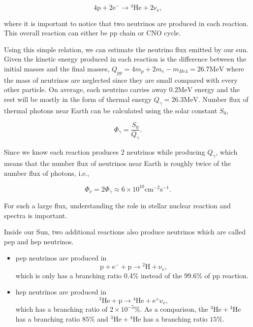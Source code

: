 \begin{equation}
\mathrm{4p+2e^- \to {}^4He + 2\nu_e },
\end{equation}

where it is important to notice that two neutrinos are produced in each reaction. This overall reaction can either be pp chain or CNO cycle.

Using this simple relation, we can estimate the neutrino flux emitted by our sun. Given the kinetic energy produced in each reaction is the difference between the initial masses and the final masses, $Q_{pp}=4m_p+2m_e-m_{He4}=26.7\mathrm{MeV}$ where the mass of neutrinos are neglected since they are small compared with every other particle. On average, each neutrino carries away $0.2\mathrm{MeV}$ energy and the rest will be mostly in the form of thermal energy $Q_\gamma=26.3\mathrm{MeV}$. Number flux of thermal photons near Earth can be calculated using the solar constant $S_0$,

\begin{equation}
\Phi_\gamma = \frac{S_0}{Q_\gamma}.
\end{equation}

Since we know each reaction produces 2 neutrinos while producing $Q_\gamma$, which means that the number flux of neutrinos near Earth is roughly twice of the number flux of photons, i.e.,

\begin{equation}
\Phi_\nu = 2 \Phi_\gamma \approx 6\times 10^{10} \mathrm{cm^{-2}s^{-1}}.
\end{equation}


For such a large flux, understanding the role in stellar nuclear reaction and spectra is important.

Inside our Sun, two additional reactions also produce neutrinos which are called pep and hep neutrinos.

\begin{itemize}
\item pep neutrinos are produced in 
\begin{equation}
\mathrm{p + e^- + p \to {}^2H +\nu_e},
\end{equation}
which is only has a branching ratio 0.4\% instead of the 99.6\% of pp reaction.
\item hep neutrinos are produced in
\begin{equation}
\mathrm{ {}^3He + p \to {}^4He + e^+ \nu_e },
\end{equation}
which has a branching ratio of $2\times 10^{-5}\%$. As a comparison, the $\mathrm{{}^3He + {}^3He}$ has a branching ratio $85\%$ and $\mathrm{{}^3He + {}^4He}$ has a branching ratio $15\%$.

\end{itemize}
















